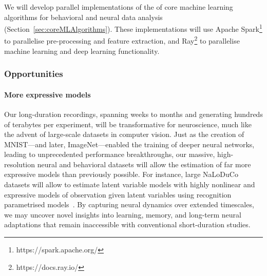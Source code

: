 \documentclass[12pt]{article}
\begin{document}

We will develop parallel implementations of the of core machine learning
algorithms for behavioral and neural data analysis (Section~\ref{sec:coreMLAlgorithms}).
These implementations will use Apache Spark\footnote{https://spark.apache.org/}
to parallelise pre-processing and feature extraction, and
Ray\footnote{https://docs.ray.io/} to parallelise machine learning and deep
learning functionality.

\subsubsection{Opportunities}

\paragraph{More expressive models}
%
Our long-duration recordings, spanning weeks to months and generating hundreds
of terabytes per experiment, will be transformative for neuroscience, much like
the advent of large-scale datasets in computer vision.  Just as the creation of
MNIST—and later, ImageNet—enabled the training of deeper neural networks,
leading to unprecedented performance breakthroughs, our massive,
high-resolution neural and behavioral datasets will allow the estimation of far
more expressive models than previously possible.
%
For instance, large NaLoDuCo datasets will allow to estimate latent variable
models with highly nonlinear and expressive models of observation given latent
variables using recognition parametrised models~\citep{walkerEtAl23}.
%
By capturing neural dynamics over extended timescales, we may uncover novel
insights into learning, memory, and long-term neural adaptations that remain
inaccessible with conventional short-duration studies.
\end{document}
